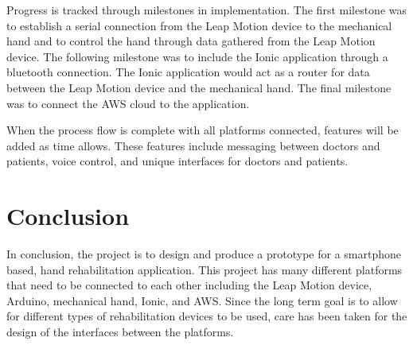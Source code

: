 \documentclass[a4paper,10pt]{article}
\begin{document}
            Progress is tracked through milestones in implementation. The first milestone was to establish a serial connection from the Leap Motion device to the mechanical hand and to control the hand through data gathered from the Leap Motion device. The following milestone was to include the Ionic application through a bluetooth connection. The Ionic application would act as a router for data between the Leap Motion device and the mechanical hand. The final milestone was to connect the AWS cloud to the application.

            When the process flow is complete with all platforms connected, features will be added as time allows. These features include messaging between doctors and patients, voice control, and unique interfaces for doctors and patients.

\section{Conclusion}

          In conclusion, the project is to design and produce a prototype for a smartphone based, hand rehabilitation application. This project has many different platforms that need to be connected to each other including the Leap Motion device, Arduino, mechanical hand, Ionic, and AWS. Since the long term goal is to allow for different types of rehabilitation devices to be used, care has been taken for the design of the interfaces between the platforms.
\end{document}
